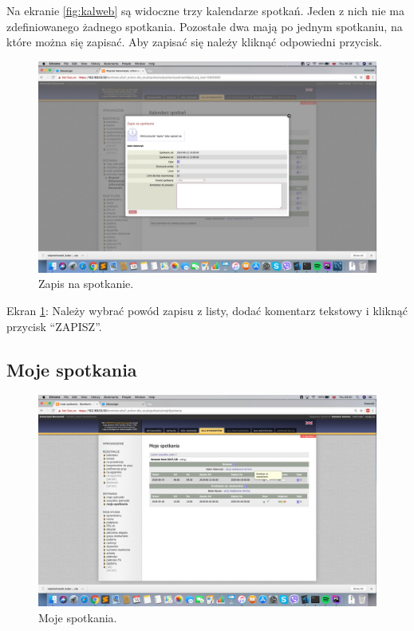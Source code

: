 \documentclass[licencjacka]{pracamgr}
\begin{document}
\begin{itemize}
Na ekranie \ref{fig:kalweb} są widoczne trzy kalendarze spotkań. Jeden z nich nie ma zdefiniowanego żadnego spotkania. Pozostałe dwa mają po jednym spotkaniu, na które można się zapisać. Aby zapisać się należy kliknąć odpowiedni przycisk.

\begin{figure}[b!]
  \includegraphics[width=\linewidth]{zapisUSOSweb.jpg}
  \caption{Zapis na spotkanie.}
  \label{fig:zapisweb}
\end{figure}

Ekran \ref{fig:zapisweb}: Należy wybrać powód zapisu z listy, dodać komentarz tekstowy i kliknąć przycisk \enquote{ZAPISZ}.

\subsection{Moje spotkania}

\begin{figure}[b!]
  \includegraphics[width=\linewidth]{mojeSpotkaniaUSOSweb.jpg}
  \caption{Moje spotkania.}
  \label{fig:mojeweb}
\end{figure}


\end{itemize}
\end{document}
